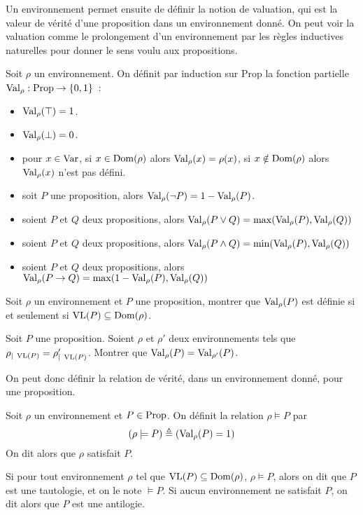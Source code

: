 Un environnement permet ensuite de définir la notion de valuation, qui est la
valeur de vérité d'une proposition dans un environnement donné. On peut voir
la valuation comme le prolongement d'un environnement par les règles inductives
naturelles pour donner le sens voulu aux propositions.

\begin{definition}[Valuation]
  Soit $\rho$ un environnement. On définit par induction sur $\mathrm{Prop}$
  la fonction partielle $\operatorname{Val}_\rho : \operatorname{Prop} \to \{0,1\}$~:
  \begin{itemize}
  \item $\operatorname{Val}_\rho(\top) = 1$.
  \item $\operatorname{Val}_\rho(\bot) = 0$.
  \item pour $x\in \operatorname{Var}$, si $x\in \operatorname{Dom}(\rho)$ alors
    $\operatorname{Val}_\rho (x)= \rho(x)$, si $x\notin \operatorname{Dom}(\rho)$ alors
    $\operatorname{Val}_\rho (x)$ n'est pas défini.
  \item soit $P$ une proposition, alors
    $\operatorname{Val}_\rho(\lnot P) = 1 - \operatorname{Val}_\rho(P)$.
  \item soient $P$ et $Q$ deux propositions, alors
    $\operatorname{Val}_\rho(P\lor Q)=\max(\operatorname{Val}_\rho(P),\operatorname{Val}_\rho(Q))$
  \item soient $P$ et $Q$ deux propositions, alors
    $\operatorname{Val}_\rho(P\land Q)=\min(\operatorname{Val}_\rho(P),\operatorname{Val}_\rho(Q))$
  \item soient $P$ et $Q$ deux propositions, alors
    $\operatorname{Val}_\rho(P\to Q) = \max(1 - \operatorname{Val}_\rho(P),\operatorname{Val}_\rho(Q))$
  \end{itemize}
\end{definition}

\begin{exercise}
  Soit $\rho$ un environnement et $P$ une proposition, montrer que
  $\operatorname{Val}_\rho(P)$ est définie si et seulement si
  $\operatorname{VL}(P)\subseteq \operatorname{Dom}(\rho)$.
\end{exercise}

\begin{exercise}\label{exo.val.VL}
  Soit $P$ une proposition. Soient $\rho$ et $\rho'$ deux environnements tels
  que $\rho_{|\;\operatorname{VL}(P)}=\rho'_{|\;\operatorname{VL}(P)}$. Montrer que
  $\operatorname{Val}_\rho(P)=\operatorname{Val}_{\rho'}(P)$.
\end{exercise}

On peut donc définir la relation de vérité, dans un environnement donné, pour
une proposition.

\begin{definition}[Satisfaction]
  Soit $\rho$ un environnement et $P\in\operatorname{Prop}$. On définit la relation
  $\rho\models P$ par $$(\rho\models P) \triangleq (\operatorname{Val}_\rho(P) = 1)$$
  On dit alors que $\rho$ satisfait $P$.

  Si pour tout environnement $\rho$ tel que $\operatorname{VL}(P)\subseteq\operatorname{Dom}(\rho)$,
  $\rho\models P$, alors on dit que $P$ est une tautologie, et on le note
  $\models P$. Si aucun environnement ne satisfait $P$, on dit alors que $P$ est
  une antilogie.
\end{definition}

